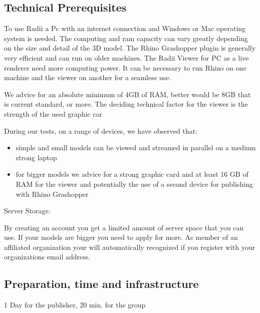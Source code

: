 \documentclass[letterpaper,10pt,english]{sphinxmanual}
\begin{document}
\subsection{Technical Prerequisites}
\label{\detokenize{tutorial/Setup/install_setup:technical-prerequisites}}
\sphinxAtStartPar
To use Radii a Pc with an internet connection and Windows or Mac operating system is needed.
The computing and ram capacity can vary greatly depending on the size and detail of the 3D model.
The Rhino Grashopper plugin is generally very efficient and can run on older machines.
The Radii Viewer for PC as a live renderer need more computing power. It can be necessary to run Rhino on one machine and the viewer on another for
a seamless use.

\sphinxAtStartPar
We advice for an absolute minimum of 4GB of RAM, better would be 8GB that is current standard, or more.
The deciding technical factor for the viewer is the strength of the used graphic car

\sphinxAtStartPar
During our tests, on a range of devices, we have observed that:
\begin{itemize}
\item {} 
\sphinxAtStartPar
simple and small models can be viewed and streamed in parallel on a medium strong laptop

\item {} 
\sphinxAtStartPar
for bigger models we advice for a strong graphic card and at least 16 GB of RAM for the viewer and potentially the use of a second device for publishing with Rhino Grashopper

\end{itemize}

\sphinxAtStartPar
Server Storage:

\sphinxAtStartPar
By creating an account you get a limited amount of server space that you can use. If your models
are bigger you need to apply for more.
As member of an affiliated organization your will automatically recognized if you register with your organizations email address.


\subsection{Preparation, time and infrastructure}
\label{\detokenize{tutorial/Setup/install_setup:preparation-time-and-infrastructure}}
\sphinxAtStartPar
{}

\sphinxAtStartPar
{} 1 Day for the publisher, 20 min. for the group
\end{document}
